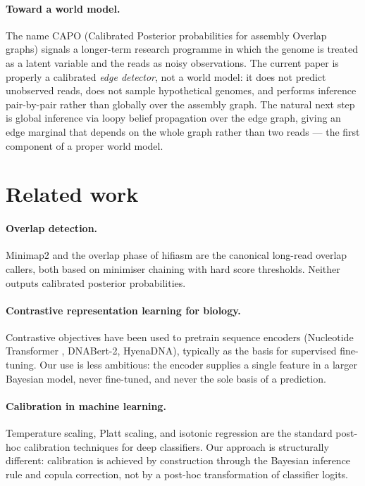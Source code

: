 \documentclass[11pt]{article}
\begin{document}
\paragraph{Toward a world model.}
The name CAPO (Calibrated Posterior probabilities for assembly Overlap graphs) signals a longer-term
research programme in which the genome is treated as a latent variable and
the reads as noisy observations. The current paper is properly a calibrated
\emph{edge detector}, not a world model: it does not predict unobserved
reads, does not sample hypothetical genomes, and performs inference
pair-by-pair rather than globally over the assembly graph. The natural
next step is global inference via loopy belief propagation over the edge
graph, giving an edge marginal that depends on the whole graph rather than
two reads --- the first component of a proper world model.

\section{Related work}

\paragraph{Overlap detection.} Minimap2 \citep{li2016minimap} and the
overlap phase of hifiasm \citep{cheng2021hifiasm} are the canonical
long-read overlap callers, both based on minimiser chaining with hard score
thresholds. Neither outputs calibrated posterior probabilities.

\paragraph{Contrastive representation learning for biology.}
Contrastive objectives have been used to pretrain sequence encoders
(Nucleotide Transformer \citep{dalla2023nucleotide}, DNABert-2, HyenaDNA),
typically as the basis for supervised fine-tuning. Our use is less
ambitious: the encoder supplies a single feature in a larger Bayesian
model, never fine-tuned, and never the sole basis of a prediction.

\paragraph{Calibration in machine learning.}
Temperature scaling, Platt scaling, and isotonic regression
\citep{guo2017calibration} are the standard post-hoc calibration
techniques for deep classifiers. Our approach is structurally different:
calibration is achieved by construction through the Bayesian inference
rule and copula correction, not by a post-hoc transformation of
classifier logits.
\end{document}
